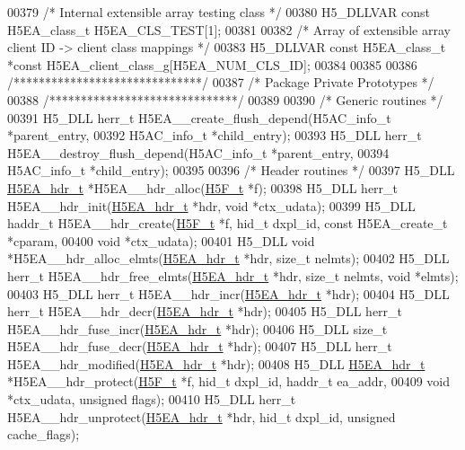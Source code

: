 \begin{DoxyCode}
00379 \textcolor{comment}{/* Internal extensible array testing class */}
00380 H5\_DLLVAR \textcolor{keyword}{const} H5EA\_class\_t H5EA\_CLS\_TEST[1];
00381 
00382 \textcolor{comment}{/* Array of extensible array client ID -> client class mappings */}
00383 H5\_DLLVAR \textcolor{keyword}{const} H5EA\_class\_t *\textcolor{keyword}{const} H5EA\_client\_class\_g[H5EA\_NUM\_CLS\_ID];
00384 
00385 
00386 \textcolor{comment}{/******************************/}
00387 \textcolor{comment}{/* Package Private Prototypes */}
00388 \textcolor{comment}{/******************************/}
00389 
00390 \textcolor{comment}{/* Generic routines */}
00391 H5\_DLL herr\_t H5EA\_\_create\_flush\_depend(H5AC\_info\_t *parent\_entry,
00392     H5AC\_info\_t *child\_entry);
00393 H5\_DLL herr\_t H5EA\_\_destroy\_flush\_depend(H5AC\_info\_t *parent\_entry,
00394     H5AC\_info\_t *child\_entry);
00395 
00396 \textcolor{comment}{/* Header routines */}
00397 H5\_DLL \hyperlink{struct_h5_e_a__hdr__t}{H5EA\_hdr\_t} *H5EA\_\_hdr\_alloc(\hyperlink{struct_h5_f__t}{H5F\_t} *f);
00398 H5\_DLL herr\_t H5EA\_\_hdr\_init(\hyperlink{struct_h5_e_a__hdr__t}{H5EA\_hdr\_t} *hdr, \textcolor{keywordtype}{void} *ctx\_udata);
00399 H5\_DLL haddr\_t H5EA\_\_hdr\_create(\hyperlink{struct_h5_f__t}{H5F\_t} *f, hid\_t dxpl\_id, \textcolor{keyword}{const} H5EA\_create\_t *cparam,
00400     \textcolor{keywordtype}{void} *ctx\_udata);
00401 H5\_DLL \textcolor{keywordtype}{void} *H5EA\_\_hdr\_alloc\_elmts(\hyperlink{struct_h5_e_a__hdr__t}{H5EA\_hdr\_t} *hdr, \textcolor{keywordtype}{size\_t} nelmts);
00402 H5\_DLL herr\_t H5EA\_\_hdr\_free\_elmts(\hyperlink{struct_h5_e_a__hdr__t}{H5EA\_hdr\_t} *hdr, \textcolor{keywordtype}{size\_t} nelmts, \textcolor{keywordtype}{void} *elmts);
00403 H5\_DLL herr\_t H5EA\_\_hdr\_incr(\hyperlink{struct_h5_e_a__hdr__t}{H5EA\_hdr\_t} *hdr);
00404 H5\_DLL herr\_t H5EA\_\_hdr\_decr(\hyperlink{struct_h5_e_a__hdr__t}{H5EA\_hdr\_t} *hdr);
00405 H5\_DLL herr\_t H5EA\_\_hdr\_fuse\_incr(\hyperlink{struct_h5_e_a__hdr__t}{H5EA\_hdr\_t} *hdr);
00406 H5\_DLL \textcolor{keywordtype}{size\_t} H5EA\_\_hdr\_fuse\_decr(\hyperlink{struct_h5_e_a__hdr__t}{H5EA\_hdr\_t} *hdr);
00407 H5\_DLL herr\_t H5EA\_\_hdr\_modified(\hyperlink{struct_h5_e_a__hdr__t}{H5EA\_hdr\_t} *hdr);
00408 H5\_DLL \hyperlink{struct_h5_e_a__hdr__t}{H5EA\_hdr\_t} *H5EA\_\_hdr\_protect(\hyperlink{struct_h5_f__t}{H5F\_t} *f, hid\_t dxpl\_id, haddr\_t ea\_addr,
00409     \textcolor{keywordtype}{void} *ctx\_udata, \textcolor{keywordtype}{unsigned} flags);
00410 H5\_DLL herr\_t H5EA\_\_hdr\_unprotect(\hyperlink{struct_h5_e_a__hdr__t}{H5EA\_hdr\_t} *hdr, hid\_t dxpl\_id, \textcolor{keywordtype}{unsigned} cache\_flags);

\end{DoxyCode}
